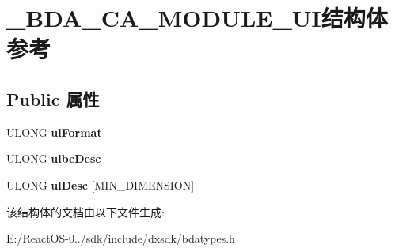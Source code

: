 \hypertarget{struct___b_d_a___c_a___m_o_d_u_l_e___u_i}{}\section{\+\_\+\+B\+D\+A\+\_\+\+C\+A\+\_\+\+M\+O\+D\+U\+L\+E\+\_\+\+U\+I结构体 参考}
\label{struct___b_d_a___c_a___m_o_d_u_l_e___u_i}
\subsection*{Public 属性}
\begin{DoxyCompactItemize}
\item 
\mbox{\label{struct___b_d_a___c_a___m_o_d_u_l_e___u_i_ac82d8cc8e439ce32d8af0801385618b2}} 
U\+L\+O\+NG {\bfseries ul\+Format}
\item 
\mbox{\label{struct___b_d_a___c_a___m_o_d_u_l_e___u_i_abcf195b7a6f5432cdc9faa51d96ac9ac}} 
U\+L\+O\+NG {\bfseries ulbc\+Desc}
\item 
\mbox{\label{struct___b_d_a___c_a___m_o_d_u_l_e___u_i_a0e6b5b8b10134b37cc972ba34ad60519}} 
U\+L\+O\+NG {\bfseries ul\+Desc} \mbox{[}M\+I\+N\+\_\+\+D\+I\+M\+E\+N\+S\+I\+ON\mbox{]}
\end{DoxyCompactItemize}


该结构体的文档由以下文件生成\+:\begin{DoxyCompactItemize}
\item 
E\+:/\+React\+O\+S-\/0../sdk/include/dxsdk/bdatypes.\+h\end{DoxyCompactItemize}
